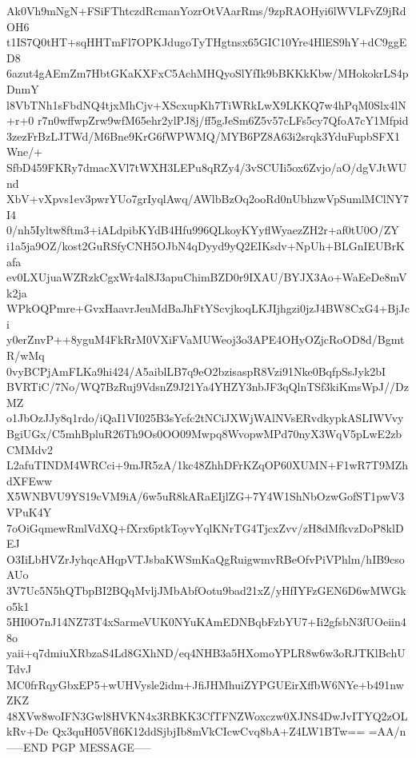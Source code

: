 Ak0Vh9mNgN+FSiFThtczdRcmanYozrOtVAarRms/9zpRAOHyi6lWVLFvZ9jRdOH6
t1IS7Q0tHT+sqHHTmFl7OPKJdugoTyTHgtnsx65GIC10Yre4HlES9hY+dC9ggED8
6azut4gAEmZm7HbtGKaKXFxC5AchMHQyoSlYfIk9bBKKkKbw/MHokokrLS4pDnmY
l8VbTNh1sFbdNQ4tjxMhCjv+XScxupKh7TiWRkLwX9LKKQ7w4hPqM0Slx4lN+r+0
r7n0wffwpZrw9wfM65ehr2ylPJ8j/ff5gJeSm6Z5v57cLFs5cy7QfoA7cY1Mfpid
3zezFrBzLJTWd/M6Bne9KrG6fWPWMQ/MYB6PZ8A63i2srqk3YduFupbSFX1Wne/+
SfbD459FKRy7dmacXVl7tWXH3LEPu8qRZy4/3vSCUIi5ox6Zvjo/aO/dgVJtWUnd
XbV+vXpvs1ev3pwrYUo7grIyqlAwq/AWlbBzOq2ooRd0nUbhzwVpSumlMClNY7I4
0/nh5Iyltw8ftm3+iALdpibKYdB4Hfu996QLkoyKYyflWyaezZH2r+af0tU0O/ZY
i1a5ja9OZ/kost2GuRSfyCNH5OJbN4qDyyd9yQ2EIKsdv+NpUh+BLGnIEUBrKafa
ev0LXUjuaWZRzkCgxWr4al8J3apuChimBZD0r9IXAU/BYJX3Ao+WaEeDe8mVk2ja
WPkOQPmre+GvxHaavrJeuMdBaJhFtYScvjkoqLKJIjhgzi0jzJ4BW8CxG4+BjJci
y0erZnvP++8yguM4FkRrM0VXiFVaMUWeoj3o3APE4OHyOZjcRoOD8d/BgmtR/wMq
0vyBCPjAmFLKa9hi424/A5aiblLB7q9eO2bzisaspR8Vzi91Nke0BqfpSsJyk2bI
BVRTiC/7No/WQ7BzRuj9VdsnZ9J21Ya4YHZY3nbJF3qQlnTSf3kiKmsWpJ//DzMZ
o1JbOzJJy8q1rdo/iQaI1VI025B3sYcfc2tNCiJXWjWAlNVsERvdkypkASLIWVvy
BgiUGx/C5mhBpluR26Th9Os0OO09Mwpq8WvopwMPd70nyX3WqV5pLwE2zbCMMdv2
L2afuTINDM4WRCci+9mJR5zA/1kc48ZhhDFrKZqOP60XUMN+F1wR7T9MZhdXFEww
X5WNBVU9YS19cVM9iA/6w5uR8kARaEIjlZG+7Y4W1ShNbOzwGofST1pwV3VPuK4Y
7oOiGqmewRmlVdXQ+fXrx6ptkToyvYqlKNrTG4TjcxZvv/zH8dMfkvzDoP8klDEJ
O3IiLbHVZrJyhqcAHqpVTJsbaKWSmKaQgRuigwmvRBeOfvPiVPhlm/hIB9csoAUo
3V7Uc5N5hQTbpBI2BQqMvljJMbAbfOotu9bad21xZ/yHfIYFzGEN6D6wMWGko5k1
5HI0O7nJ14NZ73T4xSarmeVUK0NYuKAmEDNBqbFzbYU7+Ii2gfsbN3fUOeiin48o
yaii+q7dmiuXRbzaS4Ld8GXhND/eq4NHB3a5HXomoYPLR8w6w3oRJTKlBchUTdvJ
MC0frRqyGbxEP5+wUHVysle2idm+JfiJHMhuiZYPGUEirXffbW6NYe+b491nwZKZ
48XVw8woIFN3Gwl8HVKN4x3RBKK3CfTFNZWoxczw0XJNS4DwJvITYQ2zOLkRv+De
Qx3quH05Vfl6K12ddSjbjIb8mVkCIcwCvq8bA+Z4LW1BTw==
=AA/n
-----END PGP MESSAGE-----
